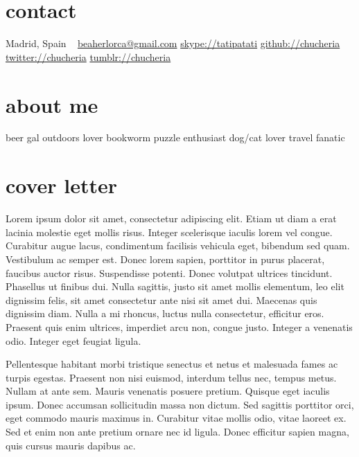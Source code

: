 \documentclass[]{friggeri-cv}
\begin{document}
\ifenglish
{}
       {}


\begin{aside}
  \section{contact}
    Madrid, Spain
    ~
    \href{mailto:beaherlorca@gmail.com}{beaherlorca@gmail.com}
    \href{skype:<tatipatati>[add]}{skype://tatipatati}
    \href{https://github.com/chucheria}{github://chucheria}
    \href{https://twitter.com/chucheria}{twitter://chucheria}
    \href{http://chucheria.tumblr.com/}{tumblr://chucheria}
  \section{about me}
    beer gal
    outdoors lover
    bookworm
    puzzle enthusiast
    dog/cat lover
    travel fanatic
\end{aside}

\section{cover letter}

\fontsize{11pt}{1.5em}\selectfont


    Lorem ipsum dolor sit amet, consectetur adipiscing elit. Etiam ut diam a erat lacinia molestie eget mollis risus. Integer scelerisque iaculis lorem vel congue. Curabitur augue lacus, condimentum facilisis vehicula eget, bibendum sed quam. Vestibulum ac semper est. Donec lorem sapien, porttitor in purus placerat, faucibus auctor risus. Suspendisse potenti. Donec volutpat ultrices tincidunt. Phasellus ut finibus dui. Nulla sagittis, justo sit amet mollis elementum, leo elit dignissim felis, sit amet consectetur ante nisi sit amet dui. Maecenas quis dignissim diam. Nulla a mi rhoncus, luctus nulla consectetur, efficitur eros. Praesent quis enim ultrices, imperdiet arcu non, congue justo. Integer a venenatis odio. Integer eget feugiat ligula.
    
    Pellentesque habitant morbi tristique senectus et netus et malesuada fames ac turpis egestas. Praesent non nisi euismod, interdum tellus nec, tempus metus. Nullam at ante sem. Mauris venenatis posuere pretium. Quisque eget iaculis ipsum. Donec accumsan sollicitudin massa non dictum. Sed sagittis porttitor orci, eget commodo mauris maximus in. Curabitur vitae mollis odio, vitae laoreet ex. Sed et enim non ante pretium ornare nec id ligula. Donec efficitur sapien magna, quis cursus mauris dapibus ac.
    
\end{document}
